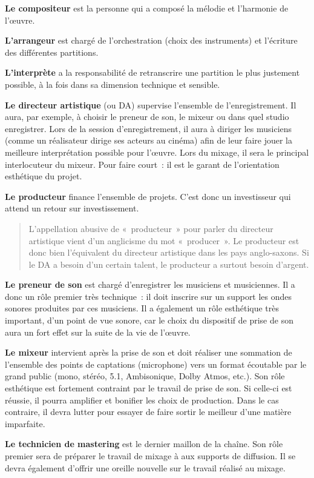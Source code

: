 \documentclass[
]{book}
\begin{document}
\textbf{Le compositeur} est la personne qui a composé la mélodie et l'harmonie de l'œuvre.

\textbf{L'arrangeur} est chargé de l'orchestration (choix des instruments) et l'écriture des différentes partitions.

\textbf{L'interprète} a la responsabilité de retranscrire une partition le plus justement possible, à la fois dans sa dimension technique et sensible.

\textbf{Le directeur artistique} (ou DA) supervise l'ensemble de l'enregistrement. Il aura, par exemple, à choisir le preneur de son, le mixeur ou dans quel studio enregistrer. Lors de la session d'enregistrement, il aura à diriger les musiciens (comme un réalisateur dirige ses acteurs au cinéma) afin de leur faire jouer la meilleure interprétation possible pour l'œuvre. Lors du mixage, il sera le principal interlocuteur du mixeur. Pour faire court~: il est le garant de l'orientation esthétique du projet.

\textbf{Le producteur} finance l'ensemble de projets. C'est donc un investisseur qui attend un retour sur investissement.

\begin{quote}
L'appellation abusive de «~producteur~» pour parler du directeur artistique vient d'un anglicisme du mot «~producer~». Le producteur est donc bien l'équivalent du directeur artistique dans les pays anglo-saxons. Si le DA a besoin d'un certain talent, le producteur a surtout besoin d'argent.
\end{quote}

\textbf{Le preneur de son} est chargé d'enregistrer les musiciens et musiciennes. Il a donc un rôle premier très technique~: il doit inscrire sur un support les ondes sonores produites par ces musiciens. Il a également un rôle esthétique très important, d'un point de vue sonore, car le choix du dispositif de prise de son aura un fort effet sur la suite de la vie de l'œuvre.

\textbf{Le mixeur} intervient après la prise de son et doit réaliser une sommation de l'ensemble des points de captations (microphone) vers un format écoutable par le grand public (mono, stéréo, 5.1, Ambisonique, Dolby Atmos, etc.). Son rôle esthétique est fortement contraint par le travail de prise de son. Si celle-ci est réussie, il pourra amplifier et bonifier les choix de production. Dans le cas contraire, il devra lutter pour essayer de faire sortir le meilleur d'une matière imparfaite.

\textbf{Le technicien de mastering} est le dernier maillon de la chaîne. Son rôle premier sera de préparer le travail de mixage à aux supports de diffusion. Il se devra également d'offrir une oreille nouvelle sur le travail réalisé au mixage.
\end{document}
